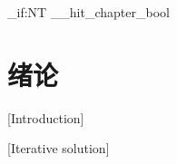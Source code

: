 
\mainmatter
\ExplSyntaxOn
\bool_if:NT \g__hit_chapter_bool { \chapter{绪论}[Introduction] }
\ExplSyntaxOff
\begin{algorithm}[!ht]
  \caption{迭代求解}[Iterative solution]
\end{algorithm}

